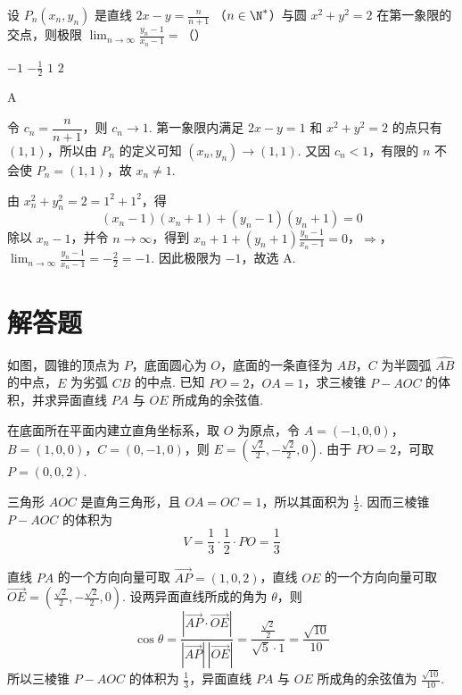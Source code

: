 \begin{problem}
设 \(P_{n}(x_{n}, y_{n})\) 是直线 \(2x - y = \frac{n}{n + 1}\) （\(n \in \N^*\)）与圆 \(x^{2} + y^{2} = 2\) 在第一象限的交点，则极限 \(\displaystyle\lim_{n \to \infty} \frac{y_{n} - 1}{x_{n} - 1} =\)（\quad）

\choices
    {\(-1\)}
    {\(-\frac{1}{2}\)}
    {\(1\)}
    {\(2\)}
\end{problem}

\begin{answer}
A
\end{answer}

\begin{solution}
令 \(c_n=\dfrac{n}{n+1}\)，则 \(c_n\to1\). 第一象限内满足 \(2x-y=1\) 和 \(x^2+y^2=2\) 的点只有 \((1,1)\)，所以由 \(P_n\) 的定义可知 \((x_n,y_n)\to(1,1)\). 又因 \(c_n<1\)，有限的 \(n\) 不会使 \(P_n=(1,1)\)，故 \(x_n\neq1\).

由 \(x_n^2+y_n^2=2=1^2+1^2\)，得
\[
(x_n-1)(x_n+1)+(y_n-1)(y_n+1)=0
\]
除以 \(x_n-1\)，并令 \(n\to\infty\)，得到
\(x_n+1+(y_n+1)\frac{y_n-1}{x_n-1}=0\)，\(\Longrightarrow\)，\(\lim_{n\to\infty}\frac{y_n-1}{x_n-1}=-\frac{2}{2}=-1\).
因此极限为 \(-1\)，故选 A.
\end{solution}

\section{解答题}

\begin{problem}
如图，圆锥的顶点为 \(P\)，底面圆心为 \(O\)，底面的一条直径为 \(AB\)，\(C\) 为半圆弧 \(\widehat{AB}\) 的中点，\(E\) 为劣弧 \(\widehat{CB}\) 的中点. 已知 \(PO = 2\)，\(OA = 1\)，求三棱锥 \(P - AOC\) 的体积，并求异面直线 \(PA\) 与 \(OE\) 所成角的余弦值.

\FloatBarrier
\end{problem}

\begin{solution}
在底面所在平面内建立直角坐标系，取 \(O\) 为原点，令 \(A=(-1,0,0)\)，\(B=(1,0,0)\)，\(C=(0,-1,0)\)，则 \(E=\left(\frac{\sqrt{2}}{2},-\frac{\sqrt{2}}{2},0\right)\). 由于 \(PO=2\)，可取 \(P=(0,0,2)\).

三角形 \(AOC\) 是直角三角形，且 \(OA=OC=1\)，所以其面积为 \(\frac{1}{2}\). 因而三棱锥 \(P-AOC\) 的体积为
\[
V=\frac{1}{3}\cdot\frac{1}{2}\cdot PO=\frac{1}{3}
\]

直线 \(PA\) 的一个方向向量可取 \(\overrightarrow{AP}=(1,0,2)\)，直线 \(OE\) 的一个方向向量可取 \(\overrightarrow{OE}=\left(\frac{\sqrt{2}}{2},-\frac{\sqrt{2}}{2},0\right)\). 设两异面直线所成的角为 \(\theta\)，则
\[
\cos\theta=\frac{|\overrightarrow{AP}\cdot\overrightarrow{OE}|}{|\overrightarrow{AP}|\,|\overrightarrow{OE}|}=\frac{\frac{\sqrt{2}}{2}}{\sqrt{5}\cdot1}=\frac{\sqrt{10}}{10}
\]
所以三棱锥 \(P-AOC\) 的体积为 \(\frac{1}{3}\)，异面直线 \(PA\) 与 \(OE\) 所成角的余弦值为 \(\frac{\sqrt{10}}{10}\).
\end{solution}

